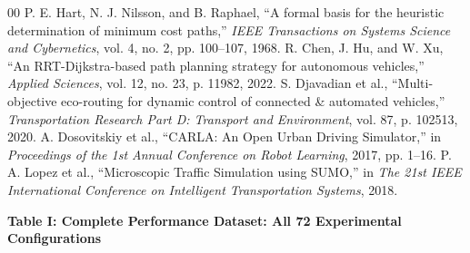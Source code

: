 \documentclass[conference]{IEEEtran}
\begin{document}
\begin{thebibliography}{00}
 P. E. Hart, N. J. Nilsson, and B. Raphael, ``A formal basis for the heuristic determination of minimum cost paths,'' \textit{IEEE Transactions on Systems Science and Cybernetics}, vol. 4, no. 2, pp. 100--107, 1968.
 R. Chen, J. Hu, and W. Xu, ``An RRT-Dijkstra-based path planning strategy for autonomous vehicles,'' \textit{Applied Sciences}, vol. 12, no. 23, p. 11982, 2022.
 S. Djavadian et al., ``Multi-objective eco-routing for dynamic control of connected \& automated vehicles,'' \textit{Transportation Research Part D: Transport and Environment}, vol. 87, p. 102513, 2020.
 A. Dosovitskiy et al., ``CARLA: An Open Urban Driving Simulator,'' in \textit{Proceedings of the 1st Annual Conference on Robot Learning}, 2017, pp. 1--16.
 P. A. Lopez et al., ``Microscopic Traffic Simulation using SUMO,'' in \textit{The 21st IEEE International Conference on Intelligent Transportation Systems}, 2018.
\end{thebibliography}

\appendix

\noindent
  \textbf{Table I: Complete Performance Dataset: All 72 Experimental Configurations}
\label{tab:complete_results}
\vspace{0.2cm}
\end{document}
